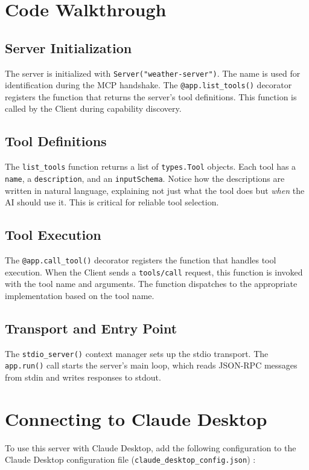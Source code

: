 \section{Code Walkthrough}
\subsection{Server Initialization}
The server is initialized with \texttt{Server("weather-server")}. The name is used for identification during the MCP handshake. The \texttt{@app.list\_tools()} decorator registers the function that returns the server's tool definitions. This function is called by the Client during capability discovery.

\subsection{Tool Definitions}
The \texttt{list\_tools} function returns a list of \texttt{types.Tool} objects. Each tool has a \texttt{name}, a \texttt{description}, and an \texttt{inputSchema}. Notice how the descriptions are written in natural language, explaining not just what the tool does but \textit{when} the AI should use it. This is critical for reliable tool selection.

\subsection{Tool Execution}
The \texttt{@app.call\_tool()} decorator registers the function that handles tool execution. When the Client sends a \texttt{tools/call} request, this function is invoked with the tool name and arguments. The function dispatches to the appropriate implementation based on the tool name.

\subsection{Transport and Entry Point}
The \texttt{stdio\_server()} context manager sets up the stdio transport. The \texttt{app.run()} call starts the server's main loop, which reads JSON-RPC messages from stdin and writes responses to stdout.

\section{Connecting to Claude Desktop}
To use this server with Claude Desktop, add the following configuration to the Claude Desktop configuration file (\texttt{claude\_desktop\_config.json}) \cite{anthropic2024mcp}:

